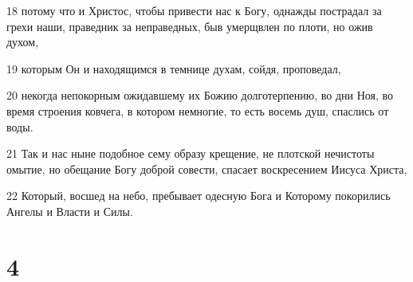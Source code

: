 \par 18 потому что и Христос, чтобы привести нас к Богу, однажды пострадал за грехи наши, праведник за неправедных, быв умерщвлен по плоти, но ожив духом,
\par 19 которым Он и находящимся в темнице духам, сойдя, проповедал,
\par 20 некогда непокорным ожидавшему их Божию долготерпению, во дни Ноя, во время строения ковчега, в котором немногие, то есть восемь душ, спаслись от воды.
\par 21 Так и нас ныне подобное сему образу крещение, не плотской нечистоты омытие, но обещание Богу доброй совести, спасает воскресением Иисуса Христа,
\par 22 Который, восшед на небо, пребывает одесную Бога и Которому покорились Ангелы и Власти и Силы.

\chapter{4}

